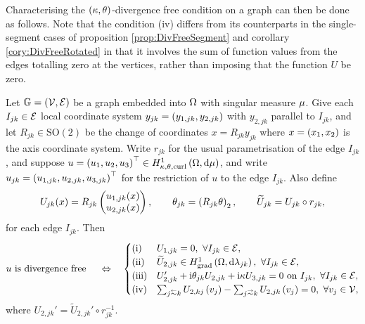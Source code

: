 Characterising the $\left( \kappa, \theta \right)$-divergence free condition on a graph can then be done as follows.
Note that the condition (iv) differs from its counterparts in the single-segment cases of proposition \ref{prop:DivFreeSegment} and corollary \ref{cory:DivFreeRotated} in that it involves the sum of function values from the edges totalling zero at the vertices, rather than imposing that the function $U$ be zero.
\begin{theorem} \label{thm:DivFreeEdgesCharacterisation}
	Let $\mathbb{G}=\left( \mathcal{V}, \mathcal{E} \right)$ be a graph embedded into $\Omega$ with singular measure $\mu$.
	Give each $I_{jk}\in\mathcal{E}$ local coordinate system $y_{jk}=\left( y_{1, jk},y_{2, jk} \right)$ with $y_{2,jk}$ parallel to $I_{jk}$, and let $R_{jk}\in\mathrm{SO}(2)$ be the change of coordinates $x=R_{jk}y_{jk}$ where $x=\left( x_1, x_2 \right)$ is the axis coordinate system.
	Write $r_{jk}$ for the usual parametrisation of the edge $I_{jk}$, and suppose $u=\left( u_1, u_2, u_3 \right)^\top\in H^1_{\kappa,\theta,\mathrm{curl}}\left( \Omega, \mathrm{d}\mu \right)$, and write $u_{jk}=\left( u_{1,jk}, u_{2,jk}, u_{3,jk} \right)^\top$ for the restriction of $u$ to the edge $I_{jk}$.
	Also define
	\begin{align*}
		U_{jk}(x) = R_{jk}\begin{pmatrix} u_{1, jk}(x) \\ u_{2, jk}(x) \end{pmatrix},
		\qquad \theta_{jk} = \left(  R_{jk}\theta  \right)_2,
		\qquad \widetilde{U}_{jk} = U_{jk} \circ r_{jk},
	\end{align*}
	for each edge $I_{jk}$.
	Then
	\begin{align*}
		u \text{ is divergence free } \quad\Leftrightarrow\quad
		\begin{cases}
			\mathrm{(i)} & U_{1, jk} = 0, \ \forall I_{jk}\in\edgeSet, \\
			\mathrm{(ii)} & \widetilde{U}_{2,jk} \in\gradSob{\ddom}{\lambda_{jk}}, \ \forall I_{jk}\in\edgeSet, \\
			\mathrm{(iii)} & U_{2,jk}' + \rmi\qm_{jk} U_{2,jk} + \rmi\wavenumber U_{3,jk} = 0 \text{ on } I_{jk}, \ \forall I_{jk}\in\edgeSet, \\
			\mathrm{(iv)} & \sum_{j\conRight k} U_{2,kj}\bracs{v_j} - \sum_{j\conLeft k} U_{2,jk}\bracs{v_j} = 0, \ \forall v_j\in\vertSet,
		\end{cases}
	\end{align*}
	where $U_{2,jk}' = \widetilde{U}_{2,jk}'\circ r_{jk}^{-1}$.
\end{theorem}
